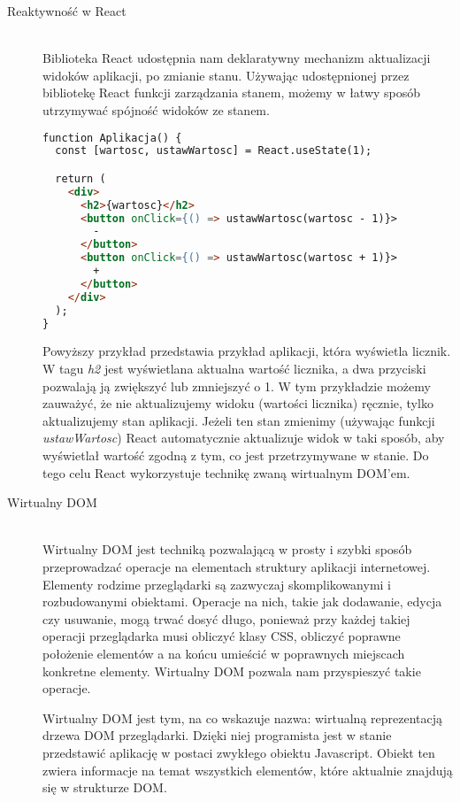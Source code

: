 \begin{description}
\item[Reaktywność w React] \hfill \\ Biblioteka React udostępnia nam deklaratywny mechanizm aktualizacji widoków aplikacji, po zmianie stanu. Używając udostępnionej przez bibliotekę React funkcji zarządzania stanem, możemy w łatwy sposób utrzymywać spójność widoków ze stanem.

\begin{lstlisting}[language=HTML, caption=Użycie mechanizmu zarządzania stanem w React, label={lst:reactCounterCode}]
function Aplikacja() {
  const [wartosc, ustawWartosc] = React.useState(1);

  return (
    <div>
      <h2>{wartosc}</h2>
      <button onClick={() => ustawWartosc(wartosc - 1)}>
        -
      </button>
      <button onClick={() => ustawWartosc(wartosc + 1)}>
        +
      </button>
    </div>
  );
}
\end{lstlisting}

Powyższy przykład przedstawia przykład aplikacji, która wyświetla licznik. W tagu \emph{h2} jest wyświetlana aktualna wartość licznika, a dwa przyciski pozwalają ją zwiększyć lub zmniejszyć o 1. W tym przykładzie możemy zauważyć, że nie aktualizujemy widoku (wartości licznika) ręcznie, tylko aktualizujemy stan aplikacji. Jeżeli ten stan zmienimy (używając funkcji \emph{ustawWartosc}) React automatycznie aktualizuje widok w taki sposób, aby wyświetlał wartość zgodną z tym, co jest przetrzymywane w stanie. Do tego celu React wykorzystuje technikę zwaną wirtualnym DOM'em.
  \vspace{0.4cm}

  \item[Wirtualny DOM] \hfill \\ Wirtualny DOM jest techniką pozwalającą w prosty i szybki sposób przeprowadzać operacje na elementach struktury aplikacji internetowej. Elementy rodzime przeglądarki są zazwyczaj skomplikowanymi i rozbudowanymi obiektami. Operacje na nich, takie jak dodawanie, edycja czy usuwanie, mogą trwać dosyć długo, ponieważ przy każdej takiej operacji przeglądarka musi obliczyć klasy CSS, obliczyć poprawne położenie elementów a na końcu umieścić w poprawnych miejscach konkretne elementy. Wirtualny DOM pozwala nam przyspieszyć takie operacje.

  Wirtualny DOM jest tym, na co wskazuje nazwa: wirtualną reprezentacją drzewa DOM przeglądarki. Dzięki niej programista jest w stanie przedstawić aplikację w postaci zwykłego obiektu Javascript. Obiekt ten zwiera informacje na temat wszystkich elementów, które aktualnie znajdują się w strukturze DOM.


\end{description}
